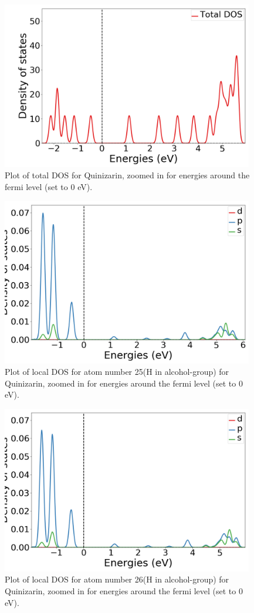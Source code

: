 \documentclass{article}
\begin{document}
      \begin{figure}[H]
        \centering
        \includegraphics[width = 11cm]{../fig/basic_TDOS_2.png}
        \caption{Plot of total DOS for Quinizarin, zoomed in for energies around the fermi level (set to 0 eV). }
        \label{fig:basic_TDOS_2}
      \end{figure}

      \begin{figure}[H]
        \centering
        \includegraphics[width = 11cm]{../fig/basic_LDOS25_2.png}
        \caption{Plot of local DOS for atom number 25(H in alcohol-group) for Quinizarin, zoomed in for energies around the fermi level (set to 0 eV). }
        \label{fig:basic_LDOS25_2}
      \end{figure}

      \begin{figure}[H]
        \centering
        \includegraphics[width = 11cm]{../fig/basic_LDOS26_2.png}
        \caption{Plot of local DOS for atom number 26(H in alcohol-group) for Quinizarin, zoomed in for energies around the fermi level (set to 0 eV). }
        \label{fig:basic_LDOS26_2}
      \end{figure}
\end{document}
